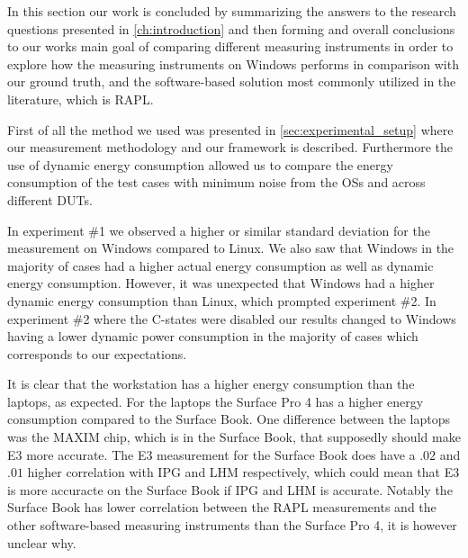 In this section our work is concluded by summarizing the answers to the research questions presented in \cref{ch:introduction} and then forming and overall conclusions to our works main goal of comparing different measuring instruments in order to explore how the measuring instruments on Windows performs in comparison with our ground truth, and the software-based solution most commonly utilized in the literature, which is RAPL. 

First of all the method we used was presented in \cref{sec:experimental_setup} where our measurement methodology and our framework is described. Furthermore the use of dynamic energy consumption allowed us to compare the energy consumption of the test cases with minimum noise from the OSs and across different DUTs. 

In experiment \#1 we observed a higher or similar standard deviation for the measurement on Windows compared to Linux. We also saw that Windows in the majority of cases had a higher actual energy consumption as well as dynamic energy consumption. However, it was unexpected that Windows had a higher dynamic energy consumption than Linux, which prompted experiment \#2. In experiment \#2 where the C-states were disabled our results changed to Windows having a lower dynamic power consumption in the majority of cases which corresponds to our expectations. 

It is clear that the workstation has a higher energy consumption than the laptops, as expected. For the laptops the Surface Pro 4 has a higher energy consumption compared to the Surface Book. One difference between the laptops was the MAXIM chip, which is in the Surface Book, that supposedly should make E3 more accurate. The E3 measurement for the Surface Book does have a $.02$ and $.01$ higher correlation with IPG and LHM respectively, which could mean that E3 is more accuracte on the Surface Book if IPG and LHM is accurate. Notably the Surface Book has lower correlation between the RAPL measurements and the other software-based measuring instruments than the Surface Pro 4, it is however unclear why.

